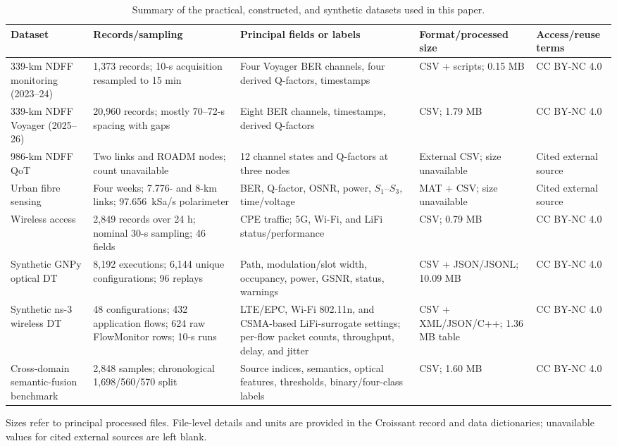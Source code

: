 \documentclass[9pt,twocolumn,twoside]{osajnl}
\begin{document}
\begin{table}[t]
\caption{Summary of the practical, constructed, and synthetic datasets used in this paper.}
\label{tab:dataset_summary}
\centering
\scriptsize
\setlength{\tabcolsep}{3.5pt}
\renewcommand{\arraystretch}{1.05}
\begin{tabularx}{\textwidth}{p{2.4cm}p{3.0cm}X p{2.5cm}p{2.1cm}}
\hline
Dataset & Records/sampling & Principal fields or labels & Format/processed size & Access/reuse terms \\
\hline
339-km NDFF monitoring (2023--24) & 1,373 records; 10-s acquisition resampled to 15 min & Four Voyager BER channels, four derived Q-factors, timestamps & CSV + scripts; 0.15 MB & CC BY-NC 4.0 \\
339-km NDFF Voyager (2025--26) & 20,960 records; mostly 70--72-s spacing with gaps & Eight BER channels, timestamps, derived Q-factors & CSV; 1.79 MB & CC BY-NC 4.0 \\
986-km NDFF QoT & Two links and ROADM nodes; count unavailable & 12 channel states and Q-factors at three nodes & External CSV; size unavailable & Cited external source \\
Urban fibre sensing & Four weeks; 7.776- and 8-km links; 97.656~kSa/s polarimeter & BER, Q-factor, OSNR, power, $S_1$--$S_3$, time/voltage & MAT + CSV; size unavailable & Cited external source \\
Wireless access & 2,849 records over 24 h; nominal 30-s sampling; 46 fields & CPE traffic; 5G, Wi-Fi, and LiFi status/performance & CSV; 0.79 MB & CC BY-NC 4.0 \\
Synthetic GNPy optical DT & 8,192 executions; 6,144 unique configurations; 96 replays & Path, modulation/slot width, occupancy, power, GSNR, status, warnings & CSV + JSON/JSONL; 10.09 MB & CC BY-NC 4.0 \\
Synthetic ns-3 wireless DT & 48 configurations; 432 application flows; 624 raw FlowMonitor rows; 10-s runs & LTE/EPC, Wi-Fi 802.11n, and CSMA-based LiFi-surrogate settings; per-flow packet counts, throughput, delay, and jitter & CSV + XML/JSON/C++; 1.36 MB table & CC BY-NC 4.0 \\
Cross-domain semantic-fusion benchmark & 2,848 samples; chronological 1,698/560/570 split & Source indices, semantics, optical features, thresholds, binary/four-class labels & CSV; 1.60 MB & CC BY-NC 4.0 \\
\hline
\end{tabularx}
\vspace{2pt}
\footnotesize Sizes refer to principal processed files. File-level details and units are provided in the Croissant record and data dictionaries; unavailable values for cited external sources are left blank.
\end{table}
\end{document}
